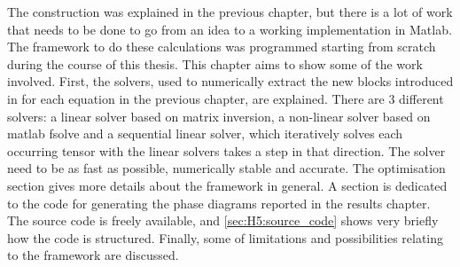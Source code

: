 The construction was explained in the previous chapter, but there is a lot of work that needs to be done to go from an idea to a working implementation in Matlab. The framework to do these calculations was programmed starting from scratch during the course of this thesis. This chapter aims to show some of the work involved.
First, the solvers, used to numerically extract the new blocks introduced in for each equation in the previous chapter, are explained. There are 3 different solvers: a linear solver based on matrix inversion, a non-linear solver based on matlab fsolve and a sequential linear solver, which iteratively solves each occurring tensor with the linear solvers takes a step in that direction. The solver need to be as fast as possible, numerically stable and accurate.
The optimisation section gives more details about the framework in general. A section is dedicated to the code for generating the phase diagrams reported in the results chapter.  The source code is freely available, and \cref{sec:H5:source_code} shows very briefly how the code is structured. Finally, some of limitations and possibilities relating to the framework are discussed.